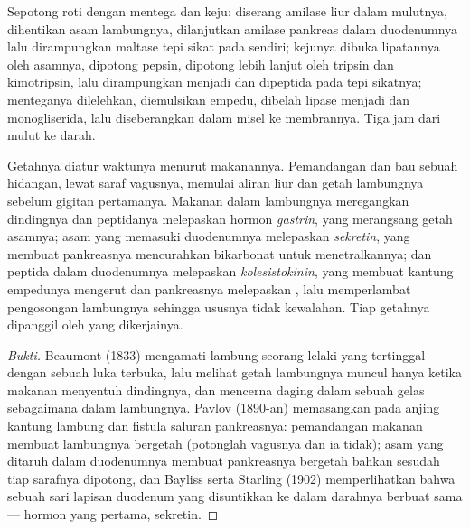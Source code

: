 \begin{example}\label{ex:b1:digestion-absorption:meal}
Sepotong roti dengan mentega dan keju:  diserang amilase liur
dalam mulutnya, dihentikan asam lambungnya, dilanjutkan amilase
pankreas dalam duodenumnya lalu dirampungkan maltase tepi sikat pada
 sendiri;  kejunya dibuka lipatannya oleh asamnya,
dipotong pepsin, dipotong lebih lanjut oleh tripsin dan kimotripsin,
lalu dirampungkan menjadi  dan dipeptida pada tepi sikatnya;
menteganya dilelehkan, diemulsikan empedu, dibelah lipase menjadi  dan monogliserida, lalu diseberangkan dalam misel ke membrannya.
Tiga jam dari mulut ke darah.
\end{example}

\begin{proposition}\label{prop:b1:digestion-absorption:control}
Getahnya diatur waktunya menurut makanannya. Pemandangan dan bau
sebuah hidangan, lewat saraf vagusnya, memulai aliran liur dan getah
lambungnya sebelum gigitan pertamanya. Makanan dalam lambungnya
meregangkan dindingnya dan peptidanya melepaskan hormon
\emph{gastrin}, yang merangsang getah asamnya; asam yang memasuki
duodenumnya melepaskan \emph{sekretin}, yang membuat pankreasnya
mencurahkan bikarbonat untuk menetralkannya;  dan peptida dalam
duodenumnya melepaskan \emph{kolesistokinin}, yang membuat kantung
empedunya mengerut dan pankreasnya melepaskan , lalu
memperlambat pengosongan lambungnya sehingga ususnya tidak kewalahan.
Tiap getahnya dipanggil oleh  yang dikerjainya.
\end{proposition}
\begin{proof}[Bukti]
Beaumont (1833) mengamati lambung seorang lelaki yang tertinggal
dengan sebuah luka terbuka, lalu melihat getah lambungnya muncul hanya
ketika makanan menyentuh dindingnya, dan mencerna daging dalam sebuah
gelas sebagaimana dalam lambungnya. Pavlov (1890-an) memasangkan pada
anjing kantung lambung dan fistula saluran pankreasnya: pemandangan
makanan membuat lambungnya bergetah (potonglah vagusnya dan ia tidak);
asam yang ditaruh dalam duodenumnya membuat pankreasnya bergetah
bahkan sesudah tiap sarafnya dipotong, dan Bayliss serta Starling
(1902) memperlihatkan bahwa sebuah sari lapisan duodenum yang
disuntikkan ke dalam darahnya berbuat sama --- hormon yang pertama,
sekretin.
\end{proof}

